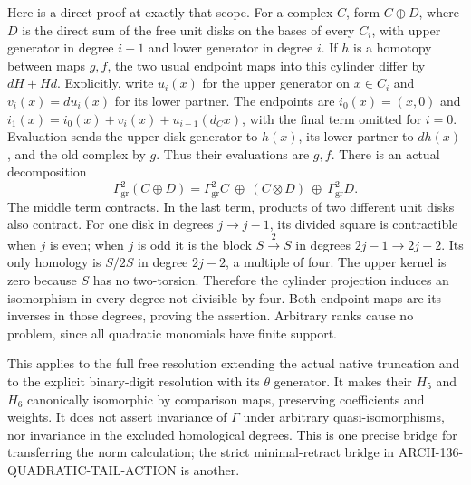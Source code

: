 Here is a direct proof at exactly that scope. For a complex
\(C\), form \(C\oplus D\), where \(D\) is the direct sum
of the free unit disks on the bases of every \(C_i\), with
upper generator in degree \(i+1\) and lower generator in
degree \(i\). If \(h\) is a homotopy between maps \(g,f\),
the two usual endpoint maps into this cylinder differ by
\(dH+Hd\). Explicitly, write \(u_i(x)\) for the upper
generator on \(x\in C_i\) and \(v_i(x)=du_i(x)\) for
its lower partner. The endpoints are
\(i_0(x)=(x,0)\) and
\(i_1(x)=i_0(x)+v_i(x)+u_{i-1}(d_Cx)\), with the final
term omitted for \(i=0\). Evaluation sends the upper disk generator to
\(h(x)\), its lower partner to \(dh(x)\), and the old
complex by \(g\). Thus their evaluations are \(g,f\).
There is an actual decomposition
\[
 \Gamma^2_{\mathrm{gr}}(C\oplus D)=
 \Gamma^2_{\mathrm{gr}}C\ \oplus\ (C\otimes D)
                     \ \oplus\ \Gamma^2_{\mathrm{gr}}D.
                                                               \tag{136.DR10}
\]
The middle term contracts. In the last term, products of two
different unit disks also contract. For one disk in degrees
\(j\to j-1\), its divided square is contractible when
\(j\) is even; when \(j\) is odd it is the block
\(S\xrightarrow{2}S\) in degrees \(2j-1\to2j-2\).
Its only homology is \(S/2S\) in degree \(2j-2\), a
multiple of four. The upper kernel is zero because \(S\)
has no two-torsion. Therefore the cylinder projection induces
an isomorphism in every degree not divisible by four.
Both endpoint maps are its inverses in those degrees, proving
the assertion. Arbitrary ranks cause no problem, since all
quadratic monomials have finite support.

This applies to the full free resolution extending the actual
native truncation and to the explicit binary-digit resolution
with its \(\theta\) generator. It makes their \(H_5\)
and \(H_6\) canonically isomorphic by comparison maps,
preserving coefficients and weights. It does not assert
invariance of \(\Gamma\) under arbitrary quasi-isomorphisms,
nor invariance in the excluded homological degrees. This is
one precise bridge for transferring the norm calculation;
the strict minimal-retract bridge in
ARCH-136-QUADRATIC-TAIL-ACTION is another.

